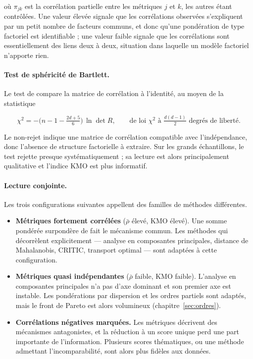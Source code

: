 \documentclass[11pt,a4paper]{article}
\theoremstyle{definition}
\theoremstyle{remark}
\begin{document}
\bigskip

où $\pi_{jk}$ est la corrélation partielle entre les métriques $j$ et $k$, les autres
étant contrôlées. Une valeur élevée signale que les corrélations observées s'expliquent
par un petit nombre de facteurs communs, et donc qu'une pondération de type factoriel est
identifiable ; une valeur faible signale que les corrélations sont essentiellement des
liens deux à deux, situation dans laquelle un modèle factoriel n'apporte rien.

\bigskip

\paragraph{Test de sphéricité de Bartlett.} Le test de \citet{bartlett1951} compare la
matrice de corrélation à l'identité, au moyen de la statistique

\medskip

\[
  \chi^2 = -\Big(n - 1 - \tfrac{2d+5}{6}\Big)\,\ln \det R,
  \qquad \text{de loi } \chi^2 \text{ à } \tfrac{d(d-1)}{2} \text{ degrés de liberté.}
\]

\bigskip

Le non-rejet indique une matrice de corrélation compatible avec l'indépendance, donc
l'absence de structure factorielle à extraire. Sur les grands échantillons, le test
rejette presque systématiquement ; sa lecture est alors principalement qualitative et
l'indice KMO est plus informatif.

\bigskip

\paragraph{Lecture conjointe.} Les trois configurations suivantes appellent des familles de
méthodes différentes.

\medskip

\begin{itemize}[nosep,leftmargin=1.4em]
  \item \textbf{Métriques fortement corrélées} ($\bar{\rho}$ élevé, KMO élevé). Une somme
  pondérée surpondère de fait le mécanisme commun. Les méthodes qui décorrèlent
  explicitement --- analyse en composantes principales, distance de Mahalanobis, CRITIC,
  transport optimal --- sont adaptées à cette configuration.
  \item \textbf{Métriques quasi indépendantes} ($\bar{\rho}$ faible, KMO faible).
  L'analyse en composantes principales n'a pas d'axe dominant et son premier axe est
  instable. Les pondérations par dispersion et les ordres partiels sont adaptés, mais le
  front de Pareto est alors volumineux (chapitre~\ref{sec:ordres}).
  \item \textbf{Corrélations négatives marquées.} Les métriques décrivent des mécanismes
  antagonistes, et la réduction à un score unique perd une part importante de
  l'information. Plusieurs scores thématiques, ou une méthode admettant
  l'incomparabilité, sont alors plus fidèles aux données.
\end{itemize}
\end{document}
